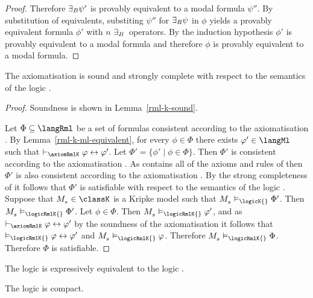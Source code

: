\begin{proof}
Therefore ${\exists_{B}} \psi'$ is provably equivalent to a modal formula $\psi''$.
By substitution of equivalents, substiting $\psi''$ for ${\exists_{B}} \psi$ in $\phi$ yields a provably equivalent formula $\phi'$ with $n$ ${\exists_{B}}$~operators.
By the induction hypothesis $\phi'$ is provably equivalent to a modal formula and therefore $\phi$ is provably equivalent to a modal formula.
\end{proof}

\begin{theorem}\label{rml-k-sound-complete}
The axiomatisation \axiomRmlK{} is sound and strongly complete with respect to the semantics of the logic \logicRmlK{}.
\end{theorem}

\begin{proof}
Soundness is shown in Lemma~\ref{rml-k-sound}.

Let $\Phi \subseteq \langRml$ be a set of formulas consistent according to the axiomatisation \axiomRmlK{}.
By Lemma~\ref{rml-k-ml-equivalent}, for every $\phi \in \Phi$ there exists $\phi' \in \langMl$ such that $\proves_\axiomRmlK \phi \iff \phi'$.
Let $\Phi' = \{\phi' \mid \phi \in \Phi\}$.
Then $\Phi'$ is consistent according to the axiomatisation \axiomRmlK{}.
As \axiomRmlK{} contains all of the axioms and rules of \axiomK{} then $\Phi'$ is also consistent according to the axiomatisation \axiomK{}.
By the strong completeness of \axiomK{} it follows that $\Phi'$ is satisfiable with respect to the semantics of the logic \logicK{}.
Suppose that $\kPModel{\kStateS} \in \classK$ is a Kripke model such that $\kPModel{\kStateS} \entails_\logicK{} \Phi'$.
Then $\kPModel{\kStateS} \entails_\logicRmlK{} \Phi'$.
Let $\phi \in \Phi$.
Then $\kPModel{\kStateS} \entails_\logicRmlK{} \phi'$, and as $\proves_\axiomRmlK \phi \iff \phi'$ by the soundness of the axiomatisation \axiomRmlK{} it follows that $\entails_\logicRmlK{} \phi \iff \phi'$ and $\kPModel{\kStateS} \entails_\logicRmlK{} \phi$.
Therefore $\kPModel{\kStateS} \entails_\logicRmlK{} \Phi$.
Therefore $\Phi$ is satisfiable.
\end{proof}

\begin{corollary}
The logic \logicRmlK{} is expressively equivalent to the logic \logicK{}.
\end{corollary}

\begin{corollary}
The logic \logicRmlK{} is compact.
\end{corollary}

